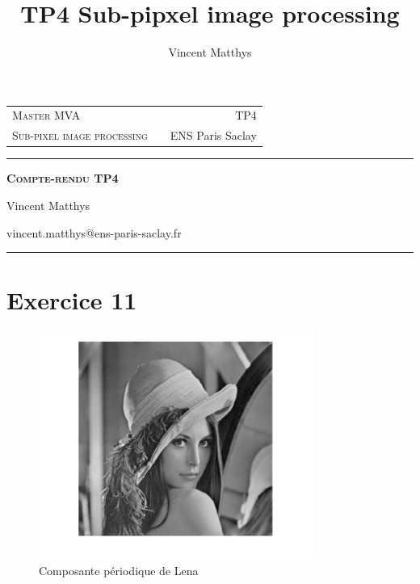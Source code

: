 \documentclass[12pt,a4paper,onecolumn]{article}
\title{TP4 Sub-pipxel image processing}
\author{Vincent Matthys}
\begin{document}
\begin{tabularx}{0.9\textwidth}{@{} l X r @{} }
	{\textsc{Master MVA}}               &  & \textsc{TP4}       \\
	\textsc{Sub-pixel image processing} &  & {ENS Paris Saclay} \\
\end{tabularx}
\vspace{1.5cm}
\begin{center}

	\rule[11pt]{5cm}{0.5pt}

	\textbf{\LARGE \textsc{Compte-rendu TP4}}
	\vspace{0.5cm}

	Vincent Matthys

	vincent.matthys@ens-paris-saclay.fr

	\rule{5cm}{0.5pt}

	\vspace{1.5cm}
\end{center}

\section{Exercice 11}


\begin{figure}[H]
	\centering
	\includegraphics[width = 0.8\textwidth]{per}
	\caption{Composante périodique de Lena}
	\label{fig_11_per}
\end{figure}
\end{document}
